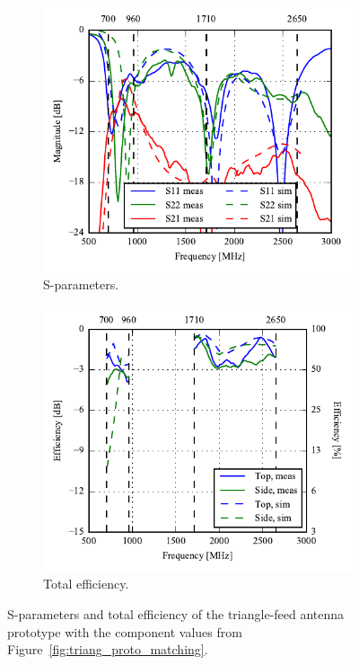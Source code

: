 \begin{figure}[htbp]
    \centering
    \begin{subfigure}{0.49\linewidth}
        \includegraphics{img/tech_sol/trianglefeed/mockup/best_sparams.pdf}
        \caption{S-parameters.}
    \end{subfigure}
    \hfill
    \begin{subfigure}{0.49\linewidth}
        \includegraphics{img/tech_sol/trianglefeed/mockup/best_efficiency.pdf}
        \caption{Total efficiency.}
    \end{subfigure}
    \caption{S-parameters and total efficiency of the triangle-feed antenna prototype with the component values from Figure~\ref{fig:triang_proto_matching}.}
    \label{fig:triang_proto_sparam_eff}
\end{figure}

